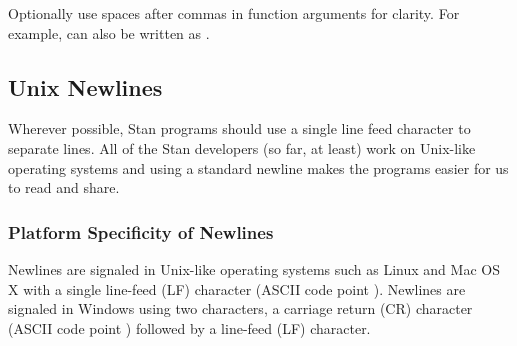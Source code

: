 Optionally use spaces after commas in function arguments for clarity.
For example,  can also be
written as .



\subsection{Unix Newlines}

Wherever possible, Stan programs should use a single line feed 
character to separate lines.  All of the Stan developers (so far, at 
least) work on Unix-like operating systems and using a standard 
newline makes the programs easier for us to read and share.  

\subsubsection{Platform Specificity of Newlines}

Newlines are signaled in Unix-like operating systems such as Linux and
Mac OS X with a single line-feed (LF) character (ASCII code point
).  Newlines are signaled in Windows using two characters,
a carriage return (CR) character (ASCII code point )
followed by a line-feed (LF) character.
